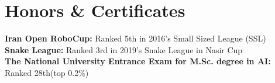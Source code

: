
\section{Honors \& Certificates}
  \vspace{2pt}
  \resumeSubHeadingListStart
    \small{\item{
      \textbf{Iran Open RoboCup:} { Ranked 5th in 2016's Small Sized League (SSL)}
      \\ \vspace{3pt}
      \textbf{Snake League:} { Ranked 3rd in 2019's Snake League in Nasir Cup}
      \\ \vspace{3pt}
      \textbf{The National University Entrance Exam for M.Sc. degree in AI:} { Ranked 28th(top 0.2\%)}
    }}
  \resumeSubHeadingListEnd